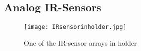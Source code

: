 \documentclass[../report.tex]{subfiles}
\begin{document}
\subsection{Analog IR-Sensors}

\begin{figure}[h!]
    \centering
    \texttt{[image: IRsensorinholder.jpg]}
    \caption{One of the IR-sensor arrays in holder}
 \end{figure}
\end{document}
